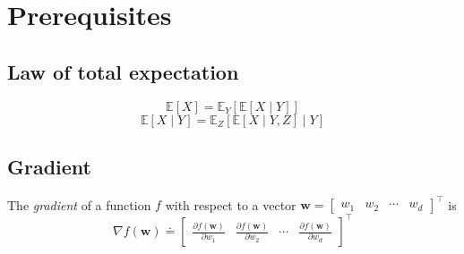 \section{Prerequisites}

\subsection{Law of total expectation}

\begin{equation}
      \mathbb{E}[X] = \mathbb{E}_Y[\mathbb{E}[X \mid Y]]
\end{equation}
\begin{equation}
      \mathbb{E}[X \mid Y] = \mathbb{E}_Z[\mathbb{E}[X \mid Y, Z] \mid Y]
\end{equation}

\subsection{Gradient}

The \textit{gradient} of a function \( f \) with respect to a vector \( \mathbf{w} = \begin{bmatrix} w_1 & w_2 & \cdots & w_d \end{bmatrix}^\top \) is
\begin{equation}
      \nabla f(\mathbf{w}) \doteq
      \begin{bmatrix}
            \frac{\partial f(\mathbf{w})}{\partial w_1}
             &
            \frac{\partial f(\mathbf{w})}{\partial w_2}
             &
            \cdots
             &
            \frac{\partial f(\mathbf{w})}{\partial w_d}
      \end{bmatrix}^\top
\end{equation}
